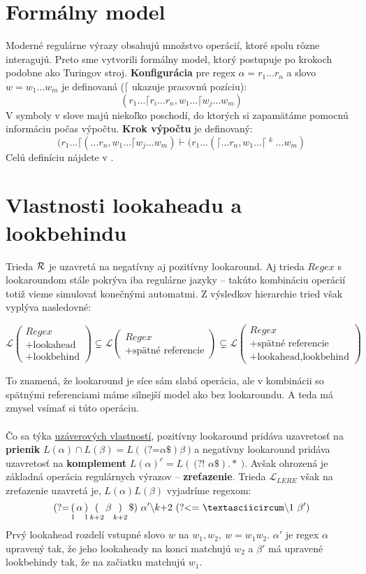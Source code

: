 \documentclass[myposter,portrait,plainboxedsections]{sciposter}
\def\R{{\cal R}} %
\def\L{\mathscr{L}} %
\def\re{Regex}
\def\lel{\mathscr{L}_{LERE}}
\def\lookahead{\text{(?=}}
\def\nlookahead{\text{(?!~}}
\def\lookbehind{\text{(?\textless =}}
\def\mysection#1{
{\color{sectionCol}\section*{\sc\bfseries #1}}}
\begin{document}
\begin{multicols*}{3}
\mysection{Formálny model} 
Moderné regulárne výrazy obsahujú množstvo operácií, ktoré spolu rôzne interagujú. Preto sme vytvorili formálny model, ktorý postupuje po krokoch podobne ako Turingov stroj. \textbf{Konfigurácia} pre regex $\alpha=r_1\dots r_n$ a slovo $w=w_1\dots w_m$ je definovaná ($\lceil$ ukazuje pracovnú pozíciu):
$$(r_1\dots \lceil r_i \dots r_n, w_1 \dots \lceil w_j \dots w_m)$$
V symboly v slove majú niekoľko poschodí, do ktorých si zapamätáme pomocnú informáciu počas výpočtu. \textbf{Krok výpočtu} je definovaný:
 $$\displaystyle (r_1 \dots \lceil ( \dots r_n, w_1 \dots \lceil w_j \dots w_m) \vdash (r_1 \dots (\lceil \dots r_n, w_1 \dots \lceil \mathop{w_j}^k \dots w_m)$$
Celú definíciu nájdete v \cite{mojaDip}.

\mysection{Vlastnosti lookaheadu a lookbehindu}

Trieda $\R$ je uzavretá na negatívny aj pozitívny lookaround. Aj trieda $\re$ s lookaroundom stále pokrýva iba regulárne jazyky -- takúto kombináciu operácií totiž vieme simulovať konečnými automatmi. Z výsledkov hierarchie tried však vyplýva nasledovné:

$$ \L \begin{pmatrix}
\re \\
\text{+lookahead} \\
\text{+lookbehind}
\end{pmatrix} 
\subsetneq
\L \begin{pmatrix}
\re \\
\text{+spätné referencie}
\end{pmatrix} 
\subsetneq
\L \begin{pmatrix}
\re \\
\text{+spätné referencie} \\
\text{+lookahead,lookbehind}
\end{pmatrix} 
$$

To znamená, že lookaround je síce sám slabá operácia, ale v kombinácii so spätnými referenciami máme silnejší model ako bez lookaroundu. A teda má zmysel vsímať si túto operáciu.
\\ \\ 
Čo sa týka \underline{uzáverových vlastností}, pozitívny lookaround pridáva uzavretosť na \textbf{prienik} $L(\alpha)\cap L(\beta) = L(~\lookahead\alpha\$)\beta~)$ a negatívny lookaround pridáva uzavretosť na \textbf{komplement} $L(\alpha)^c = L(~ \nlookahead \alpha \$).* ~)$. Avšak ohrozená je základná operácia regulárnych výrazov -- \textbf{zreťazenie}. Trieda $\lel$ však na zreťazenie uzavretá je, $L(\alpha)L(\beta)$ vyjadríme regexom:
$$
\lookahead \mathop(_1 \alpha \mathop)_1 \mathop(_{k+2}\beta \mathop)_{k+2} \mathdollar) ~\alpha ' \backslash k\text{+2}~ \lookbehind ~\textasciicircum\backslash 1~\beta ')
$$
Prvý lookahead rozdelí vstupné slovo $w$ na $w_1,w_2,~w=w_1w_2$. $\alpha'$ je regex $\alpha$ upravený tak, že jeho lookaheady na konci matchujú $w_2$ a $\beta'$ má upravené lookbehindy tak, že na začiatku matchujú $w_1$. \cite{mojaBak}
 

\end{multicols*}
\end{document}
